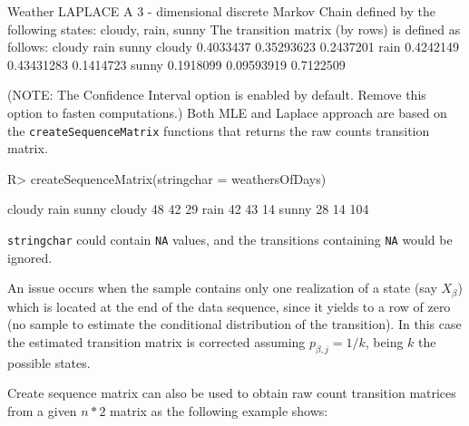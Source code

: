 \documentclass[
  nojss]{jss}
\begin{document}
\begin{CodeChunk}


\begin{CodeOutput}
Weather LAPLACE 
 A  3 - dimensional discrete Markov Chain defined by the following states: 
 cloudy, rain, sunny 
 The transition matrix  (by rows)  is defined as follows: 
          cloudy       rain     sunny
cloudy 0.4033437 0.35293623 0.2437201
rain   0.4242149 0.43431283 0.1414723
sunny  0.1918099 0.09593919 0.7122509
\end{CodeOutput}
\end{CodeChunk}

(NOTE: The Confidence Interval option is enabled by default. Remove this option to fasten computations.) Both MLE and Laplace approach are based on the \texttt{createSequenceMatrix} functions that returns the raw counts transition matrix.

\begin{CodeChunk}

\begin{CodeInput}
R> createSequenceMatrix(stringchar = weathersOfDays)
\end{CodeInput}

\begin{CodeOutput}
       cloudy rain sunny
cloudy     48   42    29
rain       42   43    14
sunny      28   14   104
\end{CodeOutput}
\end{CodeChunk}

\texttt{stringchar} could contain \texttt{NA} values, and the transitions containing \texttt{NA} would be ignored.

An issue occurs when the sample contains only one realization of a state (say \(X_{\beta}\)) which is located at the end of the data sequence, since it yields to a row of zero (no sample to estimate the conditional distribution of the transition). In this case the estimated transition matrix is corrected assuming \(p_{\beta,j}=1/k\), being \(k\) the possible states.

Create sequence matrix can also be used to obtain raw count transition matrices from a given \(n*2\) matrix as the following example shows:
\end{document}
